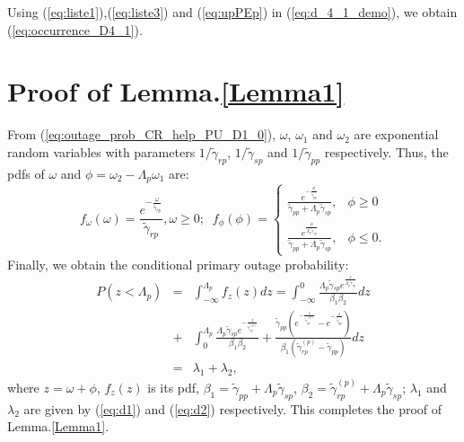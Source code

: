 \documentclass[conference,twocolumn]{IEEEtran}
\begin{document}
Using (\ref{eq:liste1}),(\ref{eq:liste3}) and (\ref{eq:upPEp}) in (\ref{eq:d_4_1_demo}), we obtain (\ref{eq:occurrence_D4_1}).


\section{Proof of Lemma.\ref{Lemma1}}
From (\ref{eq:outage_prob_CR_help_PU_D1_0}), $\omega$, $\omega_1$
and $\omega_2$ are exponential random variables with parameters $1/\tilde{\gamma}_{rp}$,
$1/\tilde{\gamma}_{sp}$ and
$1/\tilde{\gamma}_{pp}$ respectively. Thus, the
pdfs of $\omega$ and
$\phi=\omega_2-\Lambda_p \omega_1$ are:
\[
\nonumber f_\omega(\omega)=\frac{e^{-\frac{\omega}{\tilde{\gamma}_{rp}}}}{\tilde{\gamma}_{rp}},\omega \geq 0;\;\;\nonumber {{f_\phi}(\phi) = \left\{ {\begin{array}{*{20}{c}}
  {\frac{{{e^{ - \frac{\phi}{{{\tilde{ \gamma }_{pp}}}}}}}}{{{\tilde{ \gamma }_{pp}} + {\Lambda _p} \tilde{\gamma}_{{sp}}}},}&{\phi \geq 0} \\
  {\frac{{{e^{\frac{\phi}{{{\Lambda _p}\tilde \gamma_{{sp}}}}}}}}{{{\tilde{ \gamma }_{pp}} + {\Lambda _p} \tilde{\gamma}_{{sp}}}},}&{\phi \leq 0.}
\end{array}} \right.}
\]
Finally, we obtain the conditional primary outage probability:
\begin{eqnarray}
\label{eq:p_out_demo_CR_help_PU} \nonumber  P(z<\Lambda_p)& = & \int_{ -
\infty
}^{{\Lambda _p}} {{f_z}(z)dz}=\int_{ - \infty }^{{0}} {\frac{{{\Lambda _p}\tilde{\gamma}
{_{sp}}{e^{\frac{z}{{{\Lambda _p}\tilde{\gamma}
{_{sp}}}}}}}}{{{\beta _1}{\beta _2}}}}dz\\
\nonumber &+& \int_{0 }^{{\Lambda_p}} {\frac{{{\Lambda _p}\tilde{\gamma}
{_{sp}}}e^{-\frac{z}{\tilde{\gamma}_{rp}^{(p)}}}}{{{\beta _1}{\beta _2}}} + \frac{{{\tilde{\gamma} _{pp}}\left( {{e^{ - \frac{z}{{{\tilde{\gamma} _{rp}^{(p)}}}}}} -
{e^{ - \frac{z}{{{\tilde{\gamma} _{pp}}}}}}}
\right)}}{{{\beta _1}\left( {{\tilde{\gamma} _{rp}^{(p)}} - {\tilde{\gamma}
_{pp}}} \right)}}  } dz\\
& = & \lambda_1+\lambda_2,
\end{eqnarray}
where $z=\omega+\phi$, $f_z(z)$ is its pdf, $\beta_1=\tilde{\gamma}_{pp}+\Lambda_p
\tilde{\gamma}_{sp}$, $\beta_2=\tilde{\gamma}_{rp}^{(p)}+\Lambda_p \tilde{\gamma}_{sp}$; $\lambda_1$ and $\lambda_2$ are given by (\ref{eq:d1}) and (\ref{eq:d2}) respectively. This completes the proof of Lemma.\ref{Lemma1}.
\end{document}
